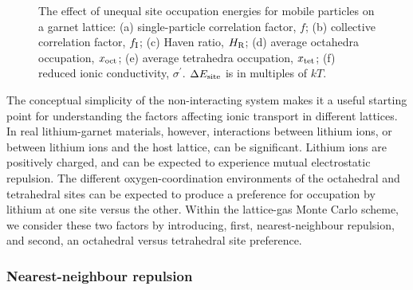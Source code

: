 \documentclass[aps,prb,twocolumn,superscriptaddress,reprint]{revtex4-1}
\begin{document}
\begin{figure}[tb]
  \centering
    \caption{\label{fig:site_energies_data}The effect of unequal site occupation energies for mobile particles on a garnet lattice: (a) single-particle correlation factor, $f$; (b) collective correlation factor, $f_{\mathrm{I}}$; (c) Haven ratio, $H_{\mathrm{R}}$; (d) average octahedra occupation, $x_{\mathrm{oct}}$; (e) average tetrahedra occupation, $x_{\mathrm{tet}}$; (f) reduced ionic conductivity, $\sigma^\prime$. $\Delta E_{\mathrm{site}}$ is in multiples of $kT$.}
\end{figure}

The conceptual simplicity of the non-interacting system makes it a useful starting point for understanding the factors affecting ionic transport in different lattices. 
In real lithium-garnet materials, however, interactions between lithium ions, or between lithium ions and the host lattice, can be significant. 
Lithium ions are positively charged, and can be expected to experience mutual electrostatic repulsion. The different oxygen-coordination environments of the octahedral and tetrahedral sites can be expected to produce a preference for occupation by lithium at one site versus the other. 
Within the lattice-gas Monte Carlo scheme, we consider these two factors by introducing, first, nearest-neighbour repulsion, and second, an octahedral versus tetrahedral site preference.

\subsubsection{Nearest-neighbour repulsion}
\end{document}
